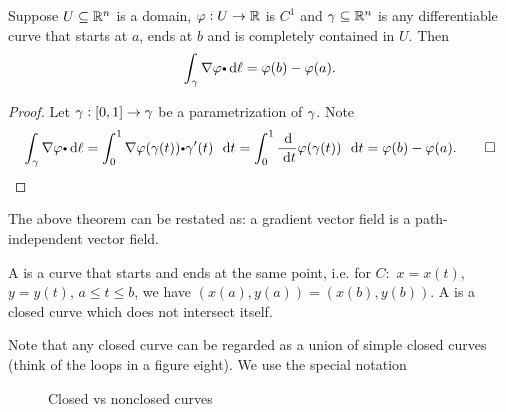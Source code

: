   \begin{theorem}
    Suppose $U \subseteq \mathbb{R}^n$ is a domain, $\varphi:U \to \mathbb{R}$ is $C^1$ and $\gamma \subseteq \mathbb{R}^n$ is any differentiable curve that starts at $a$, ends at $b$ and is completely contained in $U$.
    Then
    \begin{equation*}
      \dint_\caminho \grad \varphi \bp \dif \ell = \varphi(b) - \varphi(a).
    \end{equation*}
  \end{theorem}
  \begin{proof}
    Let $\gamma:[0, 1] \to \gamma$ be a parametrization of $\gamma$.
    Note
    \begin{equation*}
      \dint_\caminho \grad \varphi \bp \dif \ell
	= \dint_0^1 \grad \varphi(\gamma(t)) \bp \gamma'(t) \, \dt
	= \dint_0^1 \dfrac{\d}{\dt} \varphi(\gamma(t)) \, \dt
	= \varphi(b) - \varphi(a).\qed
    \end{equation*}
  \end{proof}

The above theorem can be restated as: a gradient vector field is  a  path-independent vector field.
  
  \begin{definition}
    A  is a curve that starts and ends at the same point, i.e. for $C:$
$x=x(t)$, $y=y(t)$, $a \le t \le b$, we have $(x(a),y(a)) = (x(b),y(b))$.
    A  is a closed curve which does not intersect itself.
  \end{definition}

Note that any closed curve can be
regarded as a union of simple closed curves (think of the loops in a figure eight). We use the special notation  
  
\begin{figure}[h]
 \centering
 \qquad\qquad
 \caption[]{\quad Closed vs nonclosed curves}
 \label{fig:closedcurve}
\end{figure}
  

